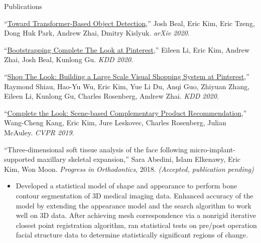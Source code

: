 \documentclass{resume}
\begin{document}
\begin{component}{Publications}
\vspace{0.5em}

``\href{https://arxiv.org/abs/2012.09958}{Toward Transformer-Based Object Detection},'' Josh Beal, Eric Kim, Eric Tzeng, Dong Huk Park, Andrew Zhai, Dmitry Kislyuk. \emph{arXiv 2020}.

\vspace{0.5em}

``\href{https://arxiv.org/abs/2006.10792}{Bootstrapping Complete The Look at Pinterest},'' Eileen Li, Eric Kim, Andrew Zhai, Josh Beal, Kunlong Gu. \emph{KDD 2020}.

\vspace{0.5em}

``\href{https://arxiv.org/abs/2006.10866}{Shop The Look: Building a Large Scale Visual Shopping System at Pinterest},'' Raymond Shiau, Hao-Yu Wu, Eric Kim, Yue Li Du, Anqi Guo, Zhiyuan Zhang, Eileen Li, Kunlong Gu, Charles Rosenberg, Andrew Zhai. \emph{KDD 2020}.

\vspace{0.5em}

``\href{https://arxiv.org/abs/1812.01748}{Complete the Look: Scene-based Complementary Product Recommendation},'' Wang-Cheng Kang, Eric Kim, Jure Leskovec, Charles Rosenberg, Julian McAuley. \emph{CVPR 2019}.

  \vspace{0.5em}
  ``Three-dimensional soft tissue analysis of the face following micro-implant-supported maxillary skeletal expansion,'' Sara Abedini, Islam Elkenawy, Eric Kim, Won Moon. \emph{Progress in Orthodontics}, 2018. \emph{(Accepted, publication pending)}
  \begin{itemize}
    \vspace{-0.5em}\item[] Developed a statistical model of shape and appearance to perform bone contour segmentation of 3D medical imaging data.
Enhanced accuracy of the model by extending the appearance model and the search algorithm to work well on 3D data.
After achieving mesh correspondence via a nonrigid iterative closest point registration algorithm, ran statistical tests on pre/post operation facial structure data to determine statistically significant regions of change.
  \end{itemize}
  

\end{component}
\end{document}
